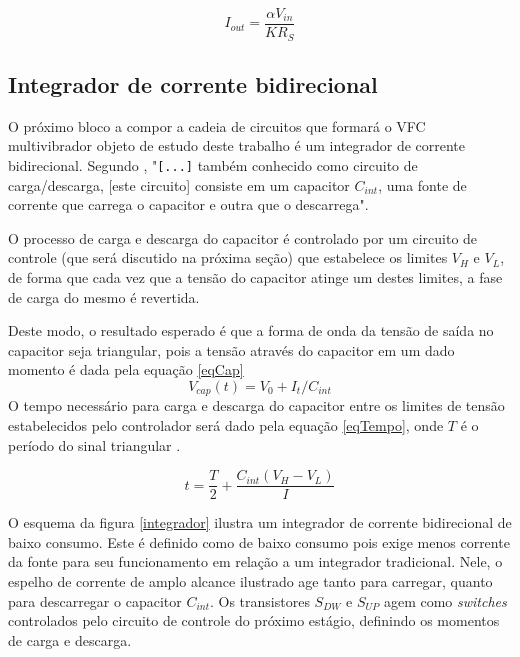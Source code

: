 \documentclass[
	12pt,				%
	oneside,			%
	a4paper,			%
	english,			%
	french,				%
	spanish,			%
	brazil				%
	]{abntex2}
\begin{document}
\begin{equation}\label{eqIout}
I_{out} = \frac{\alpha V_{in}}{KR_{S}}
\end{equation}

\subsection{Integrador de corrente bidirecional}
O próximo bloco a compor a cadeia de circuitos que formará o VFC multivibrador objeto de estudo deste trabalho é um integrador de corrente bidirecional. Segundo , "\verb|[...]| também conhecido como circuito de carga/descarga, [este circuito] consiste em um capacitor \(C_{int}\), uma fonte de corrente que carrega o capacitor e outra que o descarrega".

O processo de carga e descarga do capacitor é controlado por um circuito de controle (que será discutido na próxima seção) que estabelece os limites \(V_{H}\) e \(V_{L}\), de forma que cada vez que a tensão do capacitor atinge um destes limites, a fase de carga do mesmo é revertida.

Deste modo, o resultado esperado é que a forma de onda da tensão de saída no capacitor seja triangular, pois a tensão através do capacitor em um dado momento é dada pela equação \ref{eqCap}
\begin{equation}\label{eqCap}
V_{cap}(t) = V_0 + I_t/C_{int}
\end{equation}
O tempo necessário para carga e descarga do capacitor entre os limites de tensão estabelecidos pelo controlador será dado pela equação \ref{eqTempo}, onde \(T\) é o período do sinal triangular \cite{VFCbook}.

\begin{equation}\label{eqTempo}
t = \frac{T}{2} + \frac{C_{int}(V_{H} - V_{L})}{I}
\end{equation}

O esquema da figura \ref{integrador} ilustra um integrador de corrente bidirecional de baixo consumo. Este é definido como de baixo consumo pois exige menos corrente da fonte para seu funcionamento em relação a um integrador tradicional. Nele, o espelho de corrente de amplo alcance ilustrado age tanto para carregar, quanto para descarregar o capacitor \(C_{int}\). Os transistores \(S_{DW}\) e \(S_{UP}\) agem como \emph{switches} controlados pelo circuito de controle do próximo estágio, definindo os momentos de carga e descarga.
\end{document}
